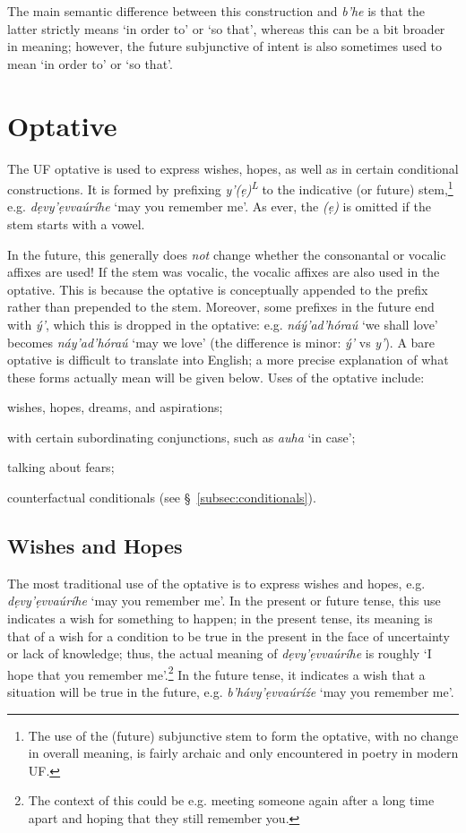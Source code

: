 \documentclass[a4paper, 12pt, twoside, openright, final]{book}
\newlength{\EnumItemSep} \EnumItemSep-3pt
\newenvironment { enum } [1] [0] {
    \vspace { -.5em }
    \settowidth \leftmargini { 99.\hskip\labelsep }
    \begin { enumerate }
    \setcounter { enumi } { #1 }
    \itemsep \EnumItemSep
} {
    \end { enumerate }
    \vspace { -.5em }
}
\def \L {\textsuperscript{L}}
\let \w \textit
\begin{document}
The main semantic difference between this construction and \w{b’he} is that the latter strictly means ‘in order to’ or ‘so that’,
whereas this can be a bit broader in meaning; however, the future subjunctive of intent is also sometimes used to mean ‘in order to’
or ‘so that’.

\section{Optative}\label{subsec:optative}
The UF optative is used to express wishes, hopes, as well as in certain conditional constructions. It is formed
by prefixing \w{y’(ẹ)\L} to the indicative (or future) stem,\footnote{The use of the (future) subjunctive stem to form the optative, with
no change in overall meaning, is fairly archaic and only encountered in poetry in modern UF.} e.g. \w{dẹvy’ẹvvaúríhe} ‘may
you remember me’. As ever, the \w{(ẹ)} is omitted if the stem starts with a vowel.

In the future, this generally does \textit{not} change whether the consonantal or vocalic affixes are used! If the stem was
vocalic, the vocalic affixes are also used in the optative. This is because the optative is conceptually appended to the prefix rather than
prepended to the stem. Moreover, some prefixes in the future end with
\w{ý’}, which this is dropped in the optative: e.g. \w{náý’ad’hóraú} ‘we shall love’ becomes \w{náy’ad’hóraú} ‘may we love’ (the
difference is minor: \w{ý’} vs \w{y’}). A bare optative is difficult to translate into English; a more precise explanation of what
these forms actually mean will be given below. Uses of the optative include:

\begin{enum}
\item wishes, hopes, dreams, and aspirations;
\item with certain subordinating conjunctions, such as \w{auha} ‘in case’;
\item talking about fears;
\item counterfactual conditionals (see §~\ref{subsec:conditionals}).
\end{enum}

\subsection{Wishes and Hopes}
The most traditional use of the optative is to express wishes and hopes, e.g. \w{dẹvy’ẹvvaúríhe} ‘may you remember me’. In
the present or future tense, this use indicates a wish for something to happen; in the present tense, its meaning is
that of a wish for a condition to be true in the present in the face of uncertainty or lack of knowledge; thus, the
actual meaning of \w{dẹvy’ẹvvaúríhe} is roughly ‘I hope that you remember me’.\footnote{The context of this could be e.g.
meeting someone again after a long time apart and hoping that they still remember you.} In the future tense, it indicates a wish
that a situation will be true in the future, e.g. \w{b’hávy’ẹvvaúríźe} ‘may you remember me’.
\end{document}
